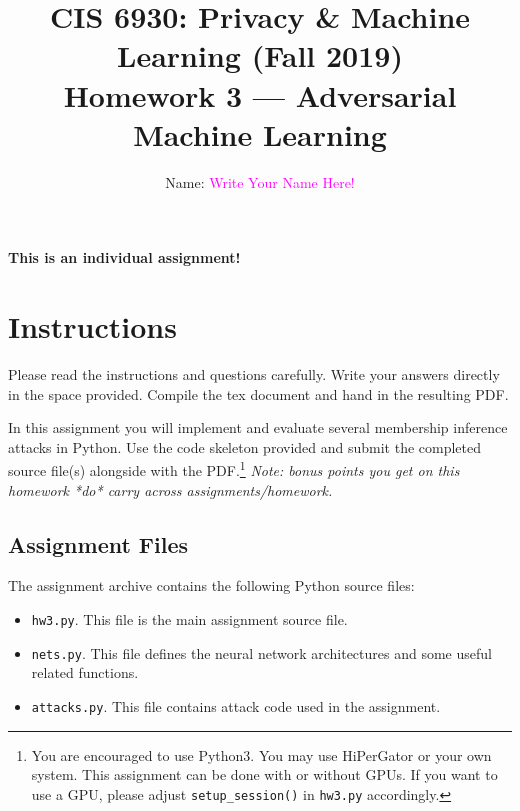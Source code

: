 \newtheorem{observation}{\bf Observation}%



\usepackage[capitalise]{cleveref}





\title{CIS 6930: Privacy \& Machine Learning (Fall 2019) \\Homework 3 --- Adversarial Machine Learning}

\author{Name: \textcolor{magenta}{Write Your Name Here!}}

\maketitle

\begin{center}
	\color{red}\bf This is an individual assignment!
\end{center}

\section*{Instructions}
%

Please read the instructions and questions carefully. Write your answers directly in the space provided. Compile the tex document and hand in the resulting PDF.

In this assignment you will implement and evaluate several membership inference attacks in Python. Use the code skeleton provided and submit the completed source file(s) alongside with the PDF.\footnote{You are encouraged to use Python3. You may use HiPerGator or your own system. This assignment can be done with or without GPUs. If you want to use a GPU, please adjust \texttt{setup\_session()} in \texttt{hw3.py} accordingly.} {\em Note: bonus points you get on this homework *do* carry across assignments/homework.}


\subsection*{Assignment Files}
%
The assignment archive contains the following Python source files:
%
\begin{itemize}[nolistsep]
	\item \texttt{hw3.py}. This file is the main assignment source file.
	\item \texttt{nets.py}. This file defines the neural network architectures and some useful related functions. 
	\item \texttt{attacks.py}. This file contains attack code used in the assignment.
\end{itemize}

